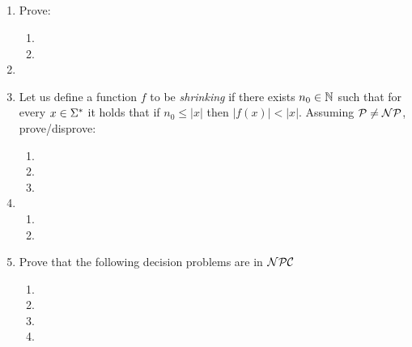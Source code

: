 \documentclass{article}
\title{
    \textmd{\bd{\hmwkClass:\ \hmwkTitle}}\\
}
\author{\hmwkAuthorName}
\begin{document}
\maketitle
\thispagestyle{firststyle}

\begin{enumerate}
      \item Prove:
            \begin{enumerate}
                  \item 
                        \pagebreak
                  \item 
            \end{enumerate}

            \pagebreak

      \item 

            \pagebreak

      \item Let us define a function $f$ to be {\it shrinking} if there exists $n_0 \in \mathbb{N}$ such that
            for every $x \in \Sigma^*$ it holds that if $n_0 \leq |x|$ then $|f(x)| < |x|$.
            Assuming $\mathcal{P} \neq \mathcal{N}\mathcal{P}$, prove/disprove:

            \begin{enumerate}
                  \item 
                  \item 
                        \pagebreak
                  \item 
            \end{enumerate}


      \item
            \begin{enumerate}
                  \item 
                  \item 
            \end{enumerate}

            \pagebreak

      \item Prove that the following decision problems are in $\mathcal{N}\mathcal{P}\mathcal{C}$

            \begin{enumerate}
                  \item 
                        \pagebreak
                  \item 
                        \pagebreak
                  \item 
                        \pagebreak
                  \item 
            \end{enumerate}

\end{enumerate}
\end{document}
